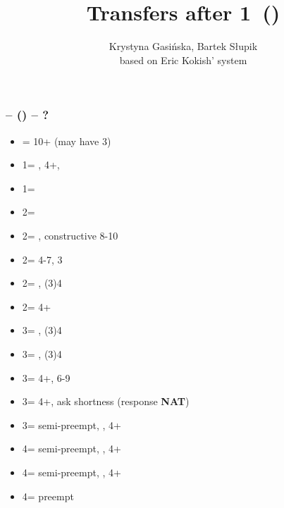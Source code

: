 \documentclass[12pt, a4paper]{article}
\title{Transfers after 1\majs\ (\dbl)}
\author{Krystyna Gasińska, Bartek Słupik\\based on Eric Kokish' system}
\begin{document}
\maketitle


\subsubsection*{\alrts{1\hearts} -- (\dbl) -- ?}
\begin{itemize}
    \item \rdbl = 10+ (may have 3\hearts)
    \item 1\spades = \nat, 4+\spades, \fonce
    \item 1\nt = \trsf{2\clubs}
    \item 2\clubs = \trsf{2\diams}
    \item 2\diams = \trsf{2\hearts}, constructive 8-10
    \item 2\hearts = 4-7, 3\hearts
    \item 2\spades = \spades, (3)4\hearts \invp
    \item 2\nt = 4+\hearts \inv
    \item 3\clubs = \clubs, (3)4\hearts \invp
    \item 3\diams = \diams, (3)4\hearts \invp
    \item 3\hearts = 4+\hearts, 6-9
    \item 3\spades = 4+\hearts, ask shortness (response \small{\textbf{NAT}}) \imp
    \item 3\nt = semi-preempt, \spades, 4+\hearts \vimp
    \item 4\clubs = semi-preempt, \clubs, 4+\hearts
    \item 4\diams = semi-preempt, \diams, 4+\hearts
    \item 4\hearts = preempt
\end{itemize}
\end{document}
